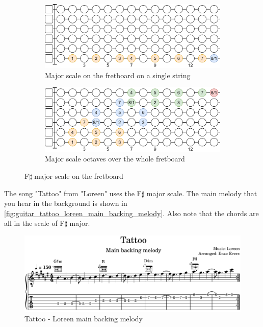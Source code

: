 \begin{figure}[h]
	\vspace{0.5cm}
	
	\begin{subfigure}[b]{\textwidth}
		\centering
		\includegraphics[height=0.18\textheight]{../../Images/guitar_major_scale_single_string.png}
		\caption{Major scale on the fretboard on a single string}
		\label{fig:guitar_major_scale_fretboard_single_string}
	\end{subfigure}
	
	\vspace{0.5cm}
	
	\begin{subfigure}[b]{\textwidth}
		\centering
		\includegraphics[height=0.18\textheight]{../../Images/guitar_major_scale_octaves_over_fretboard.png}
		\caption{Major scale octaves over the whole fretboard}
		\label{fig:guitar_major_scale_octaves_over_fretboard}
	\end{subfigure}
	
	\caption{F$\sharp$ major scale on the fretboard}
	\label{fig:guitar_major_scale_fretboard}
\end{figure}

\clearpage

The song "Tattoo" from "Loreen" uses the F$\sharp$ major scale. The main melody that you hear in the background is shown in \autoref{fig:guitar_tattoo_loreen_main_backing_melody}. Also note that the chords are all in the scale of F$\sharp$ major.

\begin{figure}[h]
	\centering
	\includegraphics[width=\textwidth]{../../MuseScore/Guitar/LoreenTattooSimpleBackingMelody.png}
	\caption{Tattoo - Loreen main backing melody}
	\label{fig:guitar_tattoo_loreen_main_backing_melody}
\end{figure}

